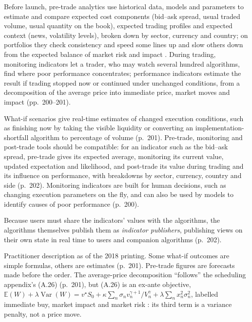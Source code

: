\begin{qfmethod}\label{meth:execution-decision-support}
 Before launch, pre-trade analytics use historical data, models and parameters to estimate and compare expected cost components (bid--ask spread, usual traded volume, usual quantity on the book), expected trading profiles and expected context (news, volatility levels), broken down by sector, currency and country; on portfolios they check consistency and speed some lines up and slow others down from the expected balance of market risk and impact \citep[sec.~3.1.3, pp.~198--199]{alpha-laruelle}. During trading, monitoring indicators let a trader, who may watch several hundred algorithms, find where poor performance concentrates; performance indicators estimate the result if trading stopped now or continued under unchanged conditions, from a decomposition of the average price into immediate price, market moves and impact (pp.~200--201).

What-if scenarios give real-time estimates of changed execution conditions, such as finishing now by taking the visible liquidity or converting an implementation-shortfall algorithm to percentage of volume (p.~201). Pre-trade, monitoring and post-trade tools should be compatible: for an indicator such as the bid--ask spread, pre-trade gives its expected average, monitoring its current value, updated expectation and likelihood, and post-trade its value during trading and its influence on performance, with breakdowns by sector, currency, country and side (p.~202). Monitoring indicators are built for human decisions, such as changing execution parameters on the fly, and can also be used by models to identify causes of poor performance (p.~200).

Because users must share the indicators' values with the algorithms, the algorithms themselves publish them as \emph{indicator publishers}, publishing views on their own state in real time to users and companion algorithms (p.~202).

 Practitioner description as of the 2018 printing. Some what-if outcomes are simple formulas, others are estimates (p.~201). Pre-trade figures are forecasts made before the order. The average-price decomposition ``follows'' the scheduling appendix's (A.26) (p.~201), but (A.26) is an ex-ante objective, $\mathbb E(W)+\lambda\operatorname{Var}(W)=v^\star S_0+\kappa\sum_n\sigma_nv_n^{\gamma+1}/V_n^\gamma+\lambda\sum_nx_n^2\sigma_n^2$, labelled immediate buy, market impact and market risk \citep[app.~A, sec.~A.7.2, p.~279]{alpha-laruelle}: its third term is a variance penalty, not a price move.


\end{qfmethod}
